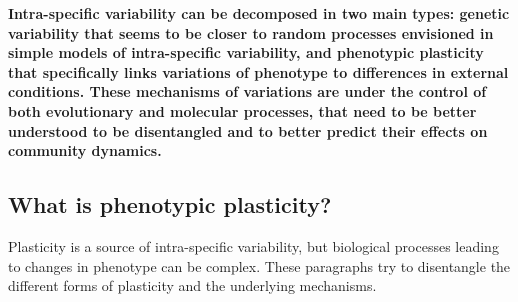 \textbf{Intra-specific variability can be decomposed in two main types: genetic variability that seems to be closer to random processes envisioned in simple models of intra-specific variability, and phenotypic plasticity that specifically links variations of phenotype to differences in external conditions. These mechanisms of variations are under the control of both evolutionary and molecular processes, that need to be better understood to be disentangled and to better predict their effects on community dynamics.}

\subsection{What is phenotypic plasticity?}

Plasticity is a source of intra-specific variability, but biological processes leading to changes in phenotype can be complex. These paragraphs try to disentangle the different forms of plasticity and the underlying mechanisms.

